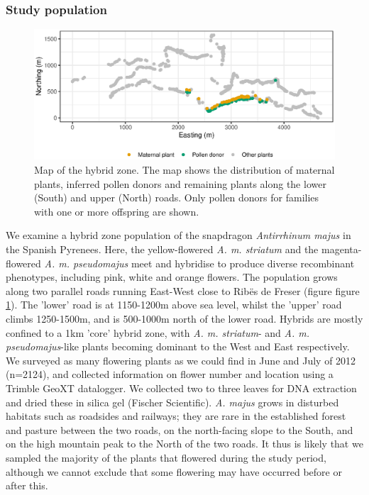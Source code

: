 \documentclass[10pt, a4paper, twocolumn]{article} %
\begin{document}
\subsubsection{Study population}

\begin{figure}
    \centering
	\includegraphics[]{map.eps} %
	\caption{
        Map of the hybrid zone.
        The map shows the distribution of maternal plants, inferred pollen donors and remaining plants along the lower (South) and upper (North) roads. Only pollen donors for families with one or more offspring are shown.}
	\label{fig:map} %
\end{figure}

We examine a hybrid zone population of the snapdragon \textit{Antirrhinum majus} in the Spanish Pyrenees. Here, the yellow-flowered \textit{A. m. striatum} and the magenta-flowered \textit{A. m. pseudomajus} meet and hybridise to produce diverse recombinant phenotypes, including pink, white and orange flowers.
The population grows along two parallel roads running East-West close to Rib\"{e}s de Freser (figure figure \ref{fig:map}). The ’lower’ road is at 1150-1200m above sea level, whilst the ’upper’ road climbs 1250-1500m, and is 500-1000m north of the lower road. Hybrids are mostly confined to a 1km ’core’ hybrid zone, with \textit{A. m. striatum}- and \textit{A. m. pseudomajus}-like plants becoming dominant to the West and East respectively. We surveyed as many flowering plants as we could find in June and July of 2012 (n=2124), and collected information on flower number and location using a Trimble GeoXT datalogger. We collected two to three leaves for DNA extraction and dried these in silica gel (Fischer Scientific). \textit{A. majus} grows in disturbed habitats such as roadsides and railways; they are rare in the established forest and pasture between the two roads, on the north-facing slope to the South, and on the high mountain peak to the North of the two roads. It thus is likely that we sampled the majority of the plants that flowered during the study period, although we cannot exclude that some flowering may have occurred before or after this. 
\end{document}
